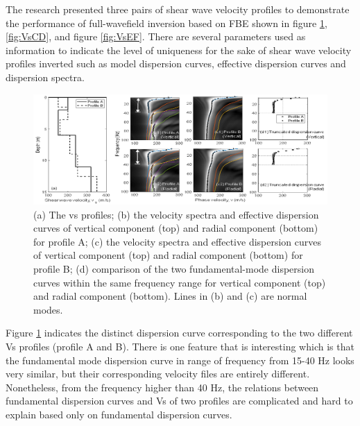 The research presented three pairs of shear wave velocity profiles to demonstrate the performance of full-wavefield inversion based on FBE shown in figure \ref{fig:VsAB},\ref{fig:VsCD}, and figure \ref{fig:VsEF}. There are several parameters used as information to indicate the level of uniqueness for the sake of shear wave velocity profiles inverted such as model dispersion curves, effective dispersion curves and dispersion spectra. 

\begin{figure}
    \centering
    \includegraphics[scale=0.45]{images/VsAB.png}
    \caption{(a) The vs profiles; (b) the velocity spectra and effective dispersion curves of vertical component (top) and radial component (bottom) for profile A; (c) the velocity spectra and effective dispersion curves of vertical component (top) and radial component (bottom) for profile B; (d) comparison of the two fundamental-mode dispersion curves within the same frequency range for vertical component (top) and radial component (bottom). Lines in (b) and (c) are normal modes.}
    \label{fig:VsAB}
\end{figure}

Figure \ref{fig:VsAB} indicates the distinct dispersion curve corresponding to the two different Vs profiles (profile A and B). There is one feature that is interesting which is that the fundamental mode dispersion curve in range of frequency from 15-40 Hz looks very similar, but their corresponding velocity files are entirely different. Nonetheless, from the frequency higher than 40 Hz, the relations between fundamental dispersion curves and Vs of two profiles are complicated and hard to explain based only on fundamental dispersion curves.   

